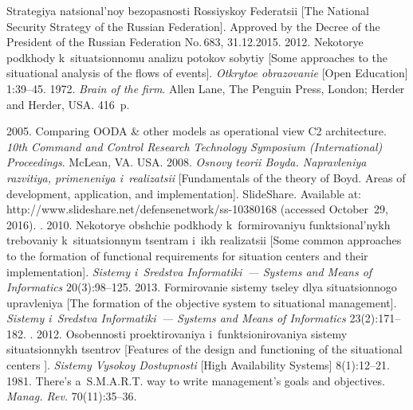 




  \begin{multicols}{2}

\renewcommand{\bibname}{\protect\rmfamily References}

{\small\frenchspacing
 {%
 \begin{thebibliography}{9}

Strategiya natsional'noy bezopasnosti Rossiyskoy Fe\-de\-ra\-tsii [The National Security Strategy of 
the Russian Federation]. Approved by the Decree of the President of the Russian Federation 
No.\,683, 31.12.2015.
 2012. Nekotorye podkhody k~situatsionnomu 
analizu potokov sobytiy [Some approaches to the situational analysis of the flows of events]. 
\textit{Otkrytoe obrazovanie} [Open Education] 1:39--45.
 1972. \textit{Brain of the firm}. Allen Lane, The Penguin Press, London; Herder 
and Herder, USA. 416~p. 

 2005. Comparing OODA \& other models as operational view C2 
architecture. \textit{10th Command and Control Research Technology Symposium 
(International) Proceedings}. McLean, VA. USA. 
 2008. \textit{Osnovy teorii Boyda. Napravleniya razvitiya, primeneniya 
i~realizatsii} [Fundamentals of the theory of Boyd. Areas of development, application, and 
implementation]. SlideShare. Available at: {\sf http://www.slideshare.net/defensenetwork/ss-10380168} (accessed  October~29, 2016).
. 2010. Nekotorye obshchie podkhody 
k~formirovaniyu funktsional'nykh trebovaniy k~situatsionnym tsentram i~ikh realizatsii [Some 
common approaches to the formation of functional requirements for situation centers and their 
implementation]. \textit{Sistemy i~Sredstva Informatiki~--- Systems and Means of Informatics} 
20(3):98--125.
 2013. Formirovanie sistemy tseley dlya si\-tu\-a\-tsi\-on\-no\-go upravleniya 
[The formation of the objective system to situational management]. \textit{Sistemy i~Sredstva 
Informatiki~--- Systems and Means of Informatics} 23(2):171--182.
. 2012. Osobennosti proektirovaniya 
i~funktsionirovaniya sistemy situatsionnykh tsentrov [Features of the design and functioning of 
the situational centers ]. \textit{Sistemy Vysokoy Dostupnosti} [High Availability Systems]  
8(1):12--21.
 1981. There's a~S.M.A.R.T. way to write management's goals and 
objectives. \textit{Manag. Rev.} 70(11):35--36.
\end{thebibliography}

}}
\end{multicols}
